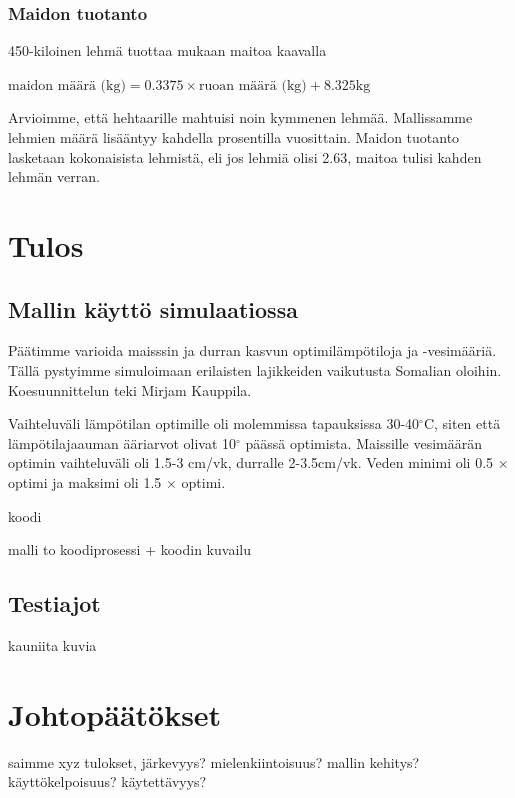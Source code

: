 \documentclass[12pt]{scrreprt}
\begin{document}
  \subsection{Maidon tuotanto}
  450-kiloinen lehmä tuottaa \cite{milk} mukaan maitoa kaavalla
  
  \begin{em}
  $ \text{maidon määrä (kg)} = 0.3375 \times \text{ruoan määrä (kg)}
  + 8.325\text{kg} $ \end{em}

  Arvioimme, että hehtaarille mahtuisi noin kymmenen lehmää. Mallissamme lehmien
  määrä lisääntyy kahdella prosentilla vuosittain. Maidon tuotanto lasketaan
  kokonaisista lehmistä, eli jos lehmiä olisi 2.63, maitoa tulisi kahden lehmän
  verran.

  \chapter{Tulos}

  \section{Mallin käyttö simulaatiossa}

  Päätimme varioida maisssin ja durran kasvun optimilämpötiloja ja -vesimääriä. Tällä pystyimme simuloimaan erilaisten lajikkeiden vaikutusta Somalian oloihin. Koesuunnittelun teki Mirjam Kauppila.

  Vaihteluväli lämpötilan optimille oli molemmissa tapauksissa 30-40$^{\circ}$C,
  siten että lämpötilajaauman ääriarvot olivat 10$^{\circ}$ päässä optimista.
  Maissille vesimäärän optimin vaihteluväli oli 1.5-3 cm/vk, durralle
  2-3.5cm/vk. Veden minimi oli 0.5 $\times$ optimi ja maksimi oli 1.5 $\times$
  optimi.

  koodi

  malli to koodiprosessi + koodin kuvailu

  \section{Testiajot}

  kauniita kuvia

  \chapter{Johtopäätökset}

  saimme xyz tulokset, järkevyys? mielenkiintoisuus? mallin kehitys? käyttökelpoisuus? käytettävyys?
  
\end{document}
